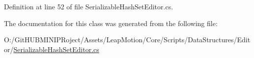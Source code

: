 Definition at line 52 of file Serializable\+Hash\+Set\+Editor.\+cs.



The documentation for this class was generated from the following file\+:\begin{DoxyCompactItemize}
\item 
O\+:/\+Git\+H\+U\+B\+M\+I\+N\+I\+P\+Roject/\+Assets/\+Leap\+Motion/\+Core/\+Scripts/\+Data\+Structures/\+Editor/\mbox{\hyperlink{_serializable_hash_set_editor_8cs}{Serializable\+Hash\+Set\+Editor.\+cs}}\end{DoxyCompactItemize}
